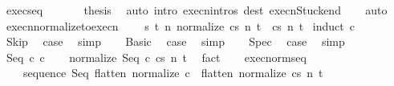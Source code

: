 \begin{isabellebody}
\ exec{\isacharunderscore}seq\ \isanewline
\ \ \ \ \isamarkupfalse%
\ {\isacharquery}thesis\ \isamarkupfalse%
\ {\isacharparenleft}auto\ intro{\isacharcolon}\ execn{\isachardot}intros\ dest{\isacharcolon}\ execn{\isacharunderscore}Stuck{\isacharunderscore}end{\isacharparenright}\isanewline
\ \ \isamarkupfalse%
\isanewline
{}\isamarkupfalse%
\ auto%
\endisatagproof
{\isafoldproof}%
%
\isadelimproof
\isanewline
%
\endisadelimproof
\isanewline
{}\isamarkupfalse%
\ execn{\isacharunderscore}normalize{\isacharunderscore}to{\isacharunderscore}execn{\isacharcolon}\ \isanewline
\ \ \ {\isachardoublequoteopen}{\isasymAnd}s\ t\ n{\isachardot}\ {\isasymGamma}{\isasymturnstile}{\isasymlangle}normalize\ c{\isacharcomma}s{\isasymrangle}\ {\isacharequal}n{\isasymRightarrow}\ t\ {\isasymLongrightarrow}\ {\isasymGamma}{\isasymturnstile}{\isasymlangle}c{\isacharcomma}s{\isasymrangle}\ {\isacharequal}n{\isasymRightarrow}\ t{\isachardoublequoteclose}\isanewline
%
\isadelimproof
%
\endisadelimproof
%
\isatagproof
{}\isamarkupfalse%
\ {\isacharparenleft}induct\ c{\isacharparenright}\isanewline
\ \ \isamarkupfalse%
\ Skip\ \isamarkupfalse%
\ {\isacharquery}case\ \isamarkupfalse%
\ simp\isanewline
{}\isamarkupfalse%
\isanewline
\ \ \isamarkupfalse%
\ Basic\ \isamarkupfalse%
\ {\isacharquery}case\ \isamarkupfalse%
\ simp\isanewline
{}\isamarkupfalse%
\isanewline
\ \ \isamarkupfalse%
\ Spec\ \isamarkupfalse%
\ {\isacharquery}case\ \isamarkupfalse%
\ simp\isanewline
{}\isamarkupfalse%
\isanewline
\ \ \isamarkupfalse%
\ {\isacharparenleft}Seq\ c{}\ c{}{\isacharparenright}\isanewline
\ \ \isamarkupfalse%
\ {\isachardoublequoteopen}{\isasymGamma}{\isasymturnstile}{\isasymlangle}normalize\ {\isacharparenleft}Seq\ c{}\ c{}{\isacharparenright}{\isacharcomma}s{\isasymrangle}\ {\isacharequal}n{\isasymRightarrow}\ t{\isachardoublequoteclose}\ \isamarkupfalse%
\ fact\isanewline
\ \ \isamarkupfalse%
\ exec{\isacharunderscore}norm{\isacharunderscore}seq{\isacharcolon}\ \isanewline
\ \ \ \ {\isachardoublequoteopen}{\isasymGamma}{\isasymturnstile}{\isasymlangle}sequence\ Seq\ {\isacharparenleft}flatten\ {\isacharparenleft}normalize\ c{}{\isacharparenright}\ {\isacharat}\ flatten\ {\isacharparenleft}normalize\ c{}{\isacharparenright}{\isacharparenright}{\isacharcomma}s{\isasymrangle}\ {\isacharequal}n{\isasymRightarrow}\ t{\isachardoublequoteclose}\isanewline

\end{isabellebody}
